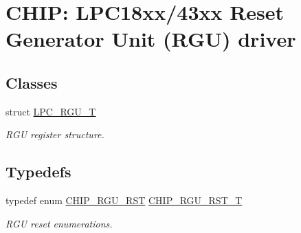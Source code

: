 \hypertarget{group___r_g_u__18_x_x__43_x_x}{}\section{C\+H\+IP\+: L\+P\+C18xx/43xx Reset Generator Unit (R\+GU) driver}
\label{group___r_g_u__18_x_x__43_x_x}
\subsection*{Classes}
\begin{DoxyCompactItemize}
\item 
struct \hyperlink{struct_l_p_c___r_g_u___t}{L\+P\+C\+\_\+\+R\+G\+U\+\_\+T}
\begin{DoxyCompactList}\small\item\em R\+GU register structure. \end{DoxyCompactList}\end{DoxyCompactItemize}
\subsection*{Typedefs}
\begin{DoxyCompactItemize}
\item 
typedef enum \hyperlink{group___r_g_u__18_x_x__43_x_x_gaba95b3f477c73ccfad274a65a9c97a9e}{C\+H\+I\+P\+\_\+\+R\+G\+U\+\_\+\+R\+ST} \hyperlink{group___r_g_u__18_x_x__43_x_x_gaf76b0dbb78e73bbcd44948364417ae60}{C\+H\+I\+P\+\_\+\+R\+G\+U\+\_\+\+R\+S\+T\+\_\+T}
\begin{DoxyCompactList}\small\item\em R\+GU reset enumerations. \end{DoxyCompactList}\end{DoxyCompactItemize}
